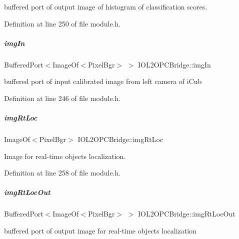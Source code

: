 buffered port of output image of histogram of classification scores. 



Definition at line 250 of file module.\+h.

\mbox{\label{group__iol2opc_a555425396bb28c42fc80bec3f5479558}} 
\subparagraph{\texorpdfstring{img\+In}{imgIn}}
{\footnotesize\ttfamily Buffered\+Port$<$Image\+Of$<$Pixel\+Bgr$>$ $>$ I\+O\+L2\+O\+P\+C\+Bridge\+::img\+In\hspace{0.3cm}{\ttfamily [protected]}}



buffered port of input calibrated image from left camera of i\+Cub 



Definition at line 246 of file module.\+h.

\mbox{\label{group__iol2opc_acc3e8bbf7c6afc78a12fc8705bccd84a}} 
\subparagraph{\texorpdfstring{img\+Rt\+Loc}{imgRtLoc}}
{\footnotesize\ttfamily Image\+Of$<$Pixel\+Bgr$>$ I\+O\+L2\+O\+P\+C\+Bridge\+::img\+Rt\+Loc\hspace{0.3cm}{\ttfamily [protected]}}



Image for real-\/time objects localization. 



Definition at line 258 of file module.\+h.

\mbox{\label{group__iol2opc_a65d96ea254077eae418dc53dd7c62a9a}} 
\subparagraph{\texorpdfstring{img\+Rt\+Loc\+Out}{imgRtLocOut}}
{\footnotesize\ttfamily Buffered\+Port$<$Image\+Of$<$Pixel\+Bgr$>$ $>$ I\+O\+L2\+O\+P\+C\+Bridge\+::img\+Rt\+Loc\+Out\hspace{0.3cm}{\ttfamily [protected]}}



buffered port of output image for real-\/time objects localization 



